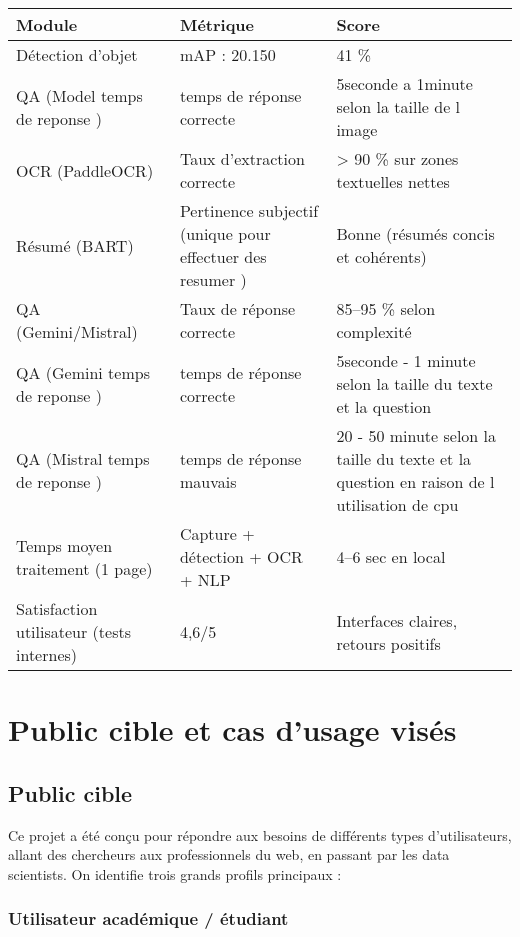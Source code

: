 \documentclass[12pt,a4paper]{report}
\begin{document}
\begin{longtable}{|p{4cm}|p{4cm}|p{6cm}|}
\hline
\textbf{Module} & \textbf{Métrique} & \textbf{Score} \\
\hline
Détection d'objet & mAP : 20.150 & 41 \% \\

\hline
QA (Model temps de reponse ) & temps de réponse correcte & 5seconde a 1minute selon la taille de l image  \\


\hline
OCR (PaddleOCR) & Taux d'extraction correcte & > 90 \% sur zones textuelles nettes \\
\hline
Résumé (BART) & Pertinence subjectif (unique pour effectuer des resumer ) & Bonne (résumés concis et cohérents) \\
\hline
QA (Gemini/Mistral) & Taux de réponse correcte & 85–95 \% selon complexité \\
\hline
QA (Gemini temps de reponse ) & temps de réponse correcte & 5seconde - 1 minute selon la taille du texte et la question  \\

QA (Mistral temps de reponse ) & temps de réponse mauvais  & 20 - 50 minute selon la taille du texte et la question en raison de l utilisation de cpu   \\


\hline
Temps moyen traitement (1 page) & Capture + détection + OCR + NLP & 4–6 sec en local \\
\hline
Satisfaction utilisateur (tests internes) & 4,6/5 & Interfaces claires, retours positifs \\
\hline
\end{longtable}


\chapter{ Public cible et cas d'usage visés}

\section{Public cible}

Ce projet a été conçu pour répondre aux besoins de différents types d'utilisateurs, allant des chercheurs aux professionnels du web, en passant par les data scientists. On identifie trois grands profils principaux :

\subsection{Utilisateur académique / étudiant}
\end{document}
